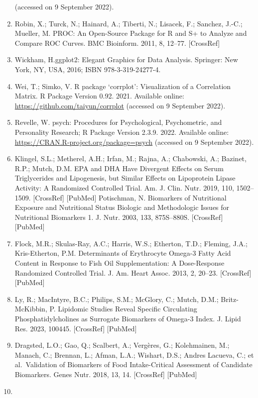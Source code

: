 \documentclass[journal=jacsat,manuscript=article]{achemso}
\begin{document}
\begin{enumerate}
  (accessed on 9 September 2022).
\item
  Robin, X.; Turck, N.; Hainard, A.; Tiberti, N.; Lisacek, F.; Sanchez,
  J.-C.; Mueller, M. PROC: An Open-Source Package for R and S+ to
  Analyze and Compare ROC Curves. BMC Bioinform. 2011, 8, 12--77.
  {[}CrossRef{]}
\item
  Wickham, H.ggplot2: Elegant Graphics for Data Analysis. Springer: New
  York, NY, USA, 2016; ISBN 978-3-319-24277-4.
\item
  Wei, T.; Simko, V. R package `corrplot': Visualization of a
  Correlation Matrix. R Package Version 0.92. 2021. Available online:
  \url{https://github.com/taiyun/corrplot} (accessed on 9 September
  2022).
\item
  Revelle, W. psych: Procedures for Psychological, Psychometric, and
  Personality Research; R Package Version 2.3.9. 2022. Available online:
  \url{https://CRAN.R-project.org/package=psych} (accessed on 9
  September 2022).
\item
  Klingel, S.L.; Metherel, A.H.; Irfan, M.; Rajna, A.; Chabowski, A.;
  Bazinet, R.P.; Mutch, D.M. EPA and DHA Have Divergent Effects on Serum
  Triglycerides and Lipogenesis, but Similar Effects on Lipoprotein
  Lipase Activity: A Randomized Controlled Trial. Am. J. Clin. Nutr.
  2019, 110, 1502--1509. {[}CrossRef{]} {[}PubMed{]} Potischman, N.
  Biomarkers of Nutritional Exposure and Nutritional Status Biologic and
  Methodologic Issues for Nutritional Biomarkers 1. J. Nutr. 2003, 133,
  875S--880S. {[}CrossRef{]} {[}PubMed{]}
\item
  Flock, M.R.; Skulas-Ray, A.C.; Harris, W.S.; Etherton, T.D.; Fleming,
  J.A.; Kris-Etherton, P.M. Determinants of Erythrocyte Omega-3 Fatty
  Acid Content in Response to Fish Oil Supplementation: A Dose-Response
  Randomized Controlled Trial. J. Am. Heart Assoc. 2013, 2, 20--23.
  {[}CrossRef{]} {[}PubMed{]}
\item
  Ly, R.; MacIntyre, B.C.; Philips, S.M.; McGlory, C.; Mutch, D.M.;
  Britz-McKibbin, P. Lipidomic Studies Reveal Specific Circulating
  Phosphatidylcholines as Surrogate Biomarkers of Omega-3 Index. J.
  Lipid Res. 2023, 100445. {[}CrossRef{]} {[}PubMed{]}
\item
  Dragsted, L.O.; Gao, Q.; Scalbert, A.; Vergères, G.; Kolehmainen, M.;
  Manach, C.; Brennan, L.; Afman, L.A.; Wishart, D.S.; Andres Lacueva,
  C.; et al.~Validation of Biomarkers of Food Intake-Critical Assessment
  of Candidate Biomarkers. Genes Nutr. 2018, 13, 14. {[}CrossRef{]}
  {[}PubMed{]}
\item

\end{enumerate}
\end{document}
